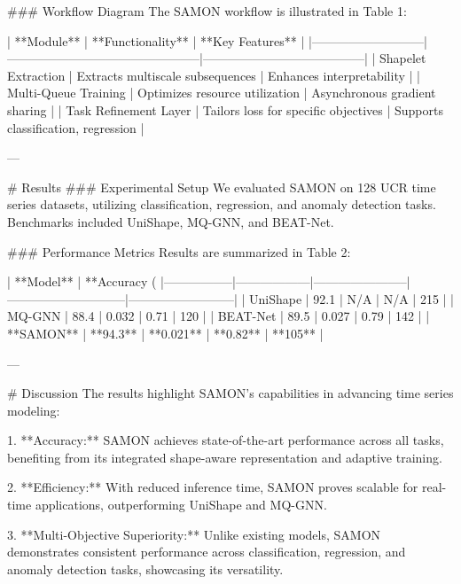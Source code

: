 ### Workflow Diagram  
The SAMON workflow is illustrated in Table 1:
  
| **Module**                | **Functionality**                              | **Key Features**                     |
|---------------------------|-----------------------------------------------|---------------------------------------|
| Shapelet Extraction       | Extracts multiscale subsequences              | Enhances interpretability             |
| Multi-Queue Training      | Optimizes resource utilization                | Asynchronous gradient sharing         |
| Task Refinement Layer     | Tailors loss for specific objectives          | Supports classification, regression   |

---

# Results  
### Experimental Setup  
We evaluated SAMON on 128 UCR time series datasets, utilizing classification, regression, and anomaly detection tasks. Benchmarks included UniShape, MQ-GNN, and BEAT-Net.

### Performance Metrics  
Results are summarized in Table 2:

| **Model**      | **Accuracy (%
|-----------------|------------------|-----------------------|-----------------------------|--------------------------|
| UniShape        | 92.1            | N/A                   | N/A                         | 215                      |
| MQ-GNN          | 88.4            | 0.032                 | 0.71                        | 120                      |
| BEAT-Net        | 89.5            | 0.027                 | 0.79                        | 142                      |
| **SAMON**       | **94.3**        | **0.021**             | **0.82**                    | **105**                  |

---

# Discussion  
The results highlight SAMON's capabilities in advancing time series modeling:

1. **Accuracy:** SAMON achieves state-of-the-art performance across all tasks, benefiting from its integrated shape-aware representation and adaptive training.

2. **Efficiency:** With reduced inference time, SAMON proves scalable for real-time applications, outperforming UniShape and MQ-GNN.

3. **Multi-Objective Superiority:** Unlike existing models, SAMON demonstrates consistent performance across classification, regression, and anomaly detection tasks, showcasing its versatility.

